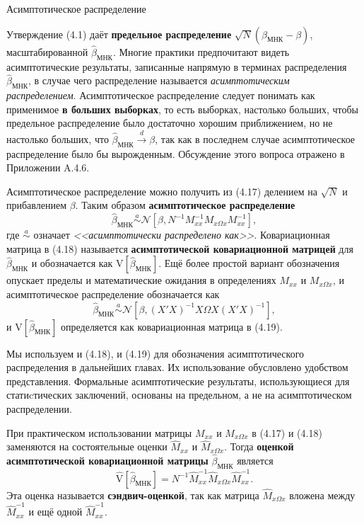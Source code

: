 \begin{center}
 Асимптотическое распределение
 \end{center} 
Утверждение (4.1) даёт \textbf{предельное распределение} $\sqrt{N}(\hat{\beta}_{\text{МНК}}-\beta)$, масштабированной $\hat{\beta}_{\text{МНК}}$. Многие практики предпочитают видеть асимптотические результаты, записанные напрямую в терминах распределения $\hat{\beta}_{\text{МНК}}$, в случае чего распределение называется \textit{асимптотическим распределением}. Асимптотическое распределение следует понимать как применимое \textbf{в больших выборках}, то есть выборках, настолько больших, чтобы предельное распределение было достаточно хорошим приближением, но не настолько больших, что $\hat{\beta}_{\text{МНК}} \xrightarrow{d}\beta$, так как в последнем случае асимптотическое распределение было бы вырожденным. Обсуждение этого вопроса отражено в Приложении A.4.6.

Асимптотическое распределение можно получить из (4.17) делением на $\sqrt{N}$ и прибавлением $\beta$. Таким образом \textbf{асимптотическое распределение} 
\begin{equation}
\hat{\beta}_{\text{МНК}} \stackrel{a}{\sim} \mathcal{N} [\beta,N^{-1} M_{xx}^{-1}M_{x \Omega x} M_{xx}^{-1}], 
\end{equation}
где $\stackrel{a}{\sim}$ означает \textit{<<асимптотически распределено как>>}. Ковариационная матрица в (4.18) называется \textbf{асимптотической ковариационной матрицей} для $\hat{\beta}_{\text{МНК}}$ и обозначается как $\mathrm{V}[\hat{\beta}_{\text{МНК}}]$. Ещё более простой вариант обозначения опускает пределы и математические ожидания в определениях $M_{xx}$ и $M_{x \Omega x}$, и асимптотическое распределение обозначается как
\begin{equation}
\hat{\beta}_{\text{МНК}} \stackrel{a}{\sim} \mathcal{N} [\beta, (X'X)^{-1} X\Omega X (X'X)^{-1}],
\end{equation}
и $\mathrm{V}[\hat{\beta}_{\text{МНК}}]$ определяется как ковариационная матрица в (4.19).

Мы используем и (4.18), и (4.19) для обозначения асимптотического распределения в дальнейших главах. Их использование обусловлено удобством представления. Формальные асимптотические результаты, использующиеся для статиcтических заключений, основаны на предельном, а не на асимптотическом распределении.

При практическом использовании матрицы $M_{xx}$ и $M_{x \Omega x}$ в (4.17) и (4.18) заменяются на состоятельные оценки $\hat{M}_{xx}$ и $\hat{M}_{x \Omega x}$. Тогда \textbf{оценкой асимптотической ковариационной матрицы}  $\hat{\beta}_{\text{МНК}}$ является
\begin{equation}
\mathrm{\hat{V}}[\hat{\beta}_{\text{МНК}}] = N^{-1} \hat{M}_{xx}^{-1} \hat{M}_{x \Omega x} \hat{M}_{xx}^{-1}.
\end{equation}
Эта оценка называется \textbf{сэндвич-оценкой}, так как матрица $ \hat{M}_{x \Omega x}$ вложена между $\hat{M}_{xx}^{-1}$ и ещё одной $\hat{M}_{xx}^{-1}$.


